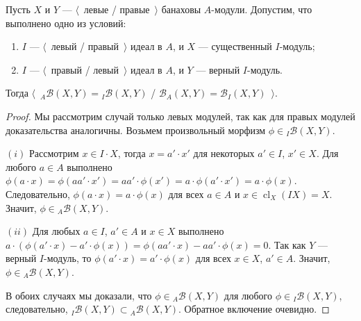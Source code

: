 \begin{proposition}\label{MorphCoincide} Пусть $X$ и $Y$ --- $\langle$~левые /
правые~$\rangle$ банаховы $A$-модули. Допустим, что выполнено одно из условий:
\begin{enumerate}[label = (\roman*)]
    \item $I$ --- $\langle$~левый / правый~$\rangle$ идеал в $A$, и $X$ ---
    существенный $I$-модуль;

    \item $I$ --- $\langle$~правый / левый~$\rangle$ идеал в $A$, и $Y$ ---
    верный $I$-модуль.
\end{enumerate}

Тогда $\langle$~${}_A\mathcal{B}(X,Y)={}_I\mathcal{B}(X,Y)$ /
$\mathcal{B}_A(X,Y)=\mathcal{B}_I(X,Y)$~$\rangle$.
\end{proposition}
\begin{proof} Мы рассмотрим случай только левых модулей, так как для правых
модулей доказательства аналогичны. Возьмем произвольный морфизм $\phi\in
{}_I\mathcal{B}(X,Y)$.

$(i)$ Рассмотрим $x\in I\cdot X$, тогда $x=a'\cdot x'$ для некоторых $a'\in I$,
$x'\in X$. Для любого $a\in A$ выполнено $\phi(a\cdot x)=\phi(aa'\cdot
x')=aa'\cdot\phi(x')=a\cdot\phi(a'\cdot x')=a\cdot\phi(x)$. Следовательно,
$\phi(a\cdot x)=a\cdot\phi(x)$ для всех $a\in A$ и $x\in
\operatorname{cl}_X(IX)=X$. Значит, $\phi\in {}_A\mathcal{B}(X,Y)$.

$(ii)$ Для любых $a\in I$, $a'\in A$ и $x\in X$ выполнено $a\cdot(\phi(a'\cdot
x)-a'\cdot\phi(x))=\phi(aa'\cdot x)-aa'\cdot\phi(x)=0$. Так как $Y$ --- верный
$I$-модуль, то $\phi(a'\cdot x)=a'\cdot \phi(x)$ для всех $x\in X$, $a'\in A$.
Значит, $\phi\in{}_A\mathcal{B}(X,Y)$.

В обоих случаях мы доказали, что $\phi\in{}_A\mathcal{B}(X,Y)$ для любого
$\phi\in{}_I\mathcal{B}(X,Y)$, следовательно, ${}_I\mathcal{B}(X,Y)\subset
{}_A\mathcal{B}(X,Y)$. Обратное включение очевидно.
\end{proof}

